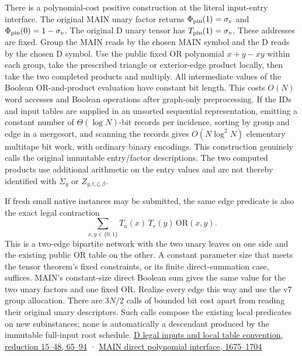 \documentclass[
  11pt,
]{article}
\begin{document}
There is a polynomial-cost positive construction at the literal
input-entry interface. The original MAIN unary factor returns
\(\Phi_{\rm pin}(1)=\sigma_v\) and \(\Phi_{\rm pin}(0)=1-\sigma_v\). The
original D unary tensor has \(T_{\rm pin}(1)=\sigma_v\). These addresses
are fixed. Group the MAIN reads by the chosen MAIN symbol and the D
reads by the chosen D symbol. Use the public fixed OR polynomial
\(x+y-xy\) within each group, take the prescribed triangle or
exterior-edge product locally, then take the two completed products and
multiply. All intermediate values of the Boolean OR-and-product
evaluation have constant bit length. This costs \(O(N)\) word accesses
and Boolean operations after graph-only preprocessing. If the IDs and
input tables are supplied in an unsorted sequential representation,
emitting a constant number of \(\Theta(\log N)\)-bit records per
incidence, sorting by group and edge in a mergesort, and scanning the
records gives \(O(N\log^2 N)\) elementary multitape bit work, with
ordinary binary encodings. This construction genuinely calls the
original immutable entry/factor descriptions. The two computed products
use additional arithmetic on the entry values and are not thereby
identified with \(\Sigma_g\) or \(Z_{g,t,\zeta,\beta}\).

If fresh small native instances may be submitted, the same edge
predicate is also the exact legal contraction \[
 \sum_{x,y\in\{0,1\}}T_u(x)\,T_v(y)\,\mathrm{OR}(x,y).
\] This is a two-edge bipartite network with the two unary leaves on one
side and the existing public OR table on the other. A constant parameter
size that meets the tensor theorem's fixed constraints, or its finite
direct-summation case, suffices. MAIN's constant-size direct Boolean sum
gives the same value for the two unary factors and one fixed OR. Realize
every edge this way and use the v7 group allocation. There are \(3N/2\)
calls of bounded bit cost apart from reading their original unary
descriptors. Such calls compose the existing local predicates on new
subinstances; none is automatically a descendant produced by the
immutable full-input root schedule.
\href{https://github.com/openai/math/blob/main/preprints/The-Exponential-Time-Hypothesis-is-False-October-25-2026/build/quantitative-reduction.tex\#L15}{D
legal inputs and local table convention, reduction 15--48, 65--94} ·
\href{https://github.com/openai/math/blob/main/preprints/The-Exponential-Time-Hypothesis-is-False-October-25-2026/build/main_full_version.tex\#L1675}{MAIN
direct polynomial interface, 1675--1704}
\end{document}
